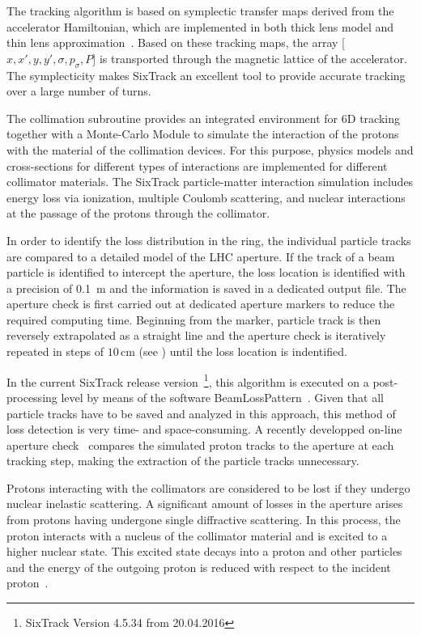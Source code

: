 The tracking algorithm is based on symplectic transfer maps derived from the accelerator Hamiltonian, which are implemented in both thick lens model and thin lens approximation~\cite{}. Based on these tracking maps, the array [$x,x',y,y',\sigma,p_\sigma,P$] is transported through the magnetic lattice of the accelerator. The symplecticity makes SixTrack an excellent tool to provide accurate tracking over a large number of turns. 

The collimation subroutine provides an integrated environment for 6D tracking together with a Monte-Carlo Module to simulate the interaction of the protons with the material of the collimation devices. For this purpose, physics models and cross-sections for different types of interactions are implemented for different collimator materials. The SixTrack particle-matter interaction simulation includes energy loss via ionization, multiple Coulomb scattering, and nuclear interactions at the passage of the protons through the collimator. 

In order to identify the loss distribution in the ring, the individual particle tracks are compared to a detailed model of the LHC aperture. If the track of a beam particle is identified to intercept the aperture, the loss location is identified with a precision of 0.1~m and the information is saved in a dedicated output file. The aperture check is first carried out at dedicated aperture markers to reduce the required computing time. Beginning from the marker, particle track is then reversely extrapolated as a straight line and the aperture check is iteratively repeated in steps of $10\,$cm (see ) until the loss location is indentified.  

In the current SixTrack release version~\footnote{SixTrack Version 4.5.34 from 20.04.2016}, this algorithm is executed on a post-processing level by means of the software BeamLossPattern~\cite{}. Given that all particle tracks have to be saved and analyzed in this approach, this method of loss detection is very time- and space-consuming. A recently developped on-line aperture check~\cite{} compares the simulated proton tracks to the aperture at each tracking step, making the extraction of the particle tracks unnecessary.  

Protons interacting with the collimators are considered to be lost if they undergo nuclear inelastic scattering. A significant amount of losses in the aperture arises from protons having undergone single diffractive scattering. In this process, the proton interacts with a nucleus of the collimator material and is excited to a higher nuclear state. This excited state decays into a proton and other particles and the energy of the outgoing proton is reduced with respect to the incident proton~\cite{}. 

